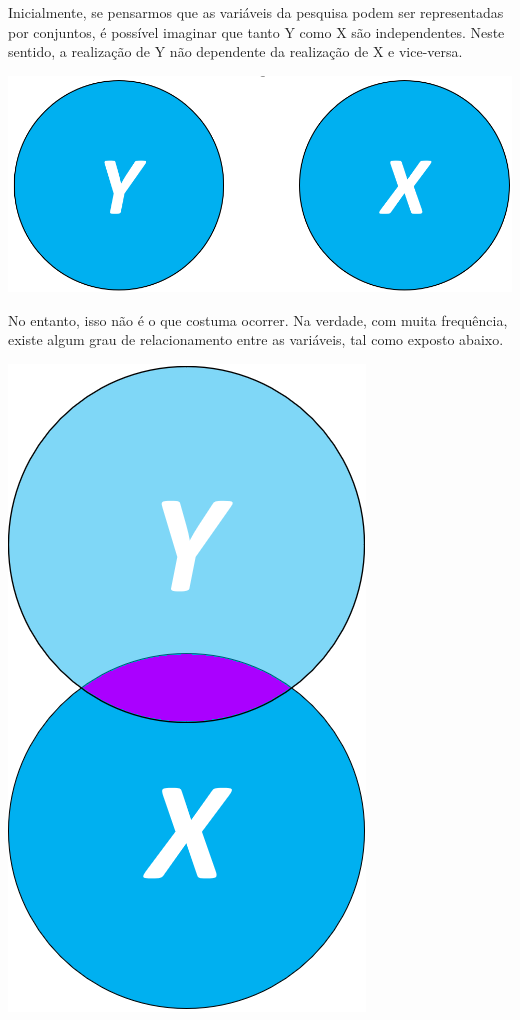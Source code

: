\documentclass[
]{book}
\begin{document}
Inicialmente, se pensarmos que as variáveis da pesquisa podem ser
representadas por conjuntos, é possível imaginar que tanto Y como X são
independentes. Neste sentido, a realização de Y não dependente da
realização de X e vice-versa.

\includegraphics{./img/cap_reg_xy.png}

No entanto, isso não é o que costuma ocorrer. Na verdade, com muita
frequência, existe algum grau de relacionamento entre as variáveis, tal
como exposto abaixo.

\includegraphics{./img/cap_reg_x_y2.png}
\end{document}
